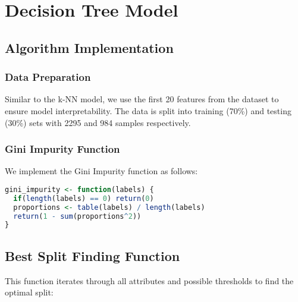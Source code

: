 \section{Decision Tree Model}

\subsection{Algorithm Implementation}

\subsubsection{Data Preparation}

Similar to the k-NN model, we use the first 20 features from the dataset to ensure model interpretability. The data is split into training (70\%) and testing (30\%) sets with 2295 and 984 samples respectively.

\subsubsection{Gini Impurity Function}

We implement the Gini Impurity function as follows:

\begin{lstlisting}[language=R, caption=Gini Impurity Function]
gini_impurity <- function(labels) {
  if(length(labels) == 0) return(0)
  proportions <- table(labels) / length(labels)
  return(1 - sum(proportions^2))
}
\end{lstlisting}

\subsection{Best Split Finding Function}

This function iterates through all attributes and possible thresholds to find the optimal split:

